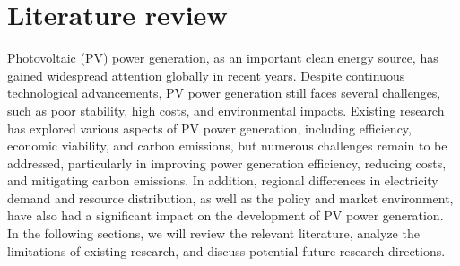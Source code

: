 \documentclass{article}
\begin{document}
	\section{Literature review}
	Photovoltaic (PV) power generation, as an important clean energy source, has gained widespread attention globally in recent years. Despite continuous technological advancements, PV power generation still faces several challenges, such as poor stability, high costs, and environmental impacts. Existing research has explored various aspects of PV power generation, including efficiency, economic viability, and carbon emissions, but numerous challenges remain to be addressed, particularly in improving power generation efficiency, reducing costs, and mitigating carbon emissions. In addition, regional differences in electricity demand and resource distribution, as well as the policy and market environment, have also had a significant impact on the development of PV power generation. In the following sections, we will review the relevant literature, analyze the limitations of existing research, and discuss potential future research directions.
	
\end{document}
